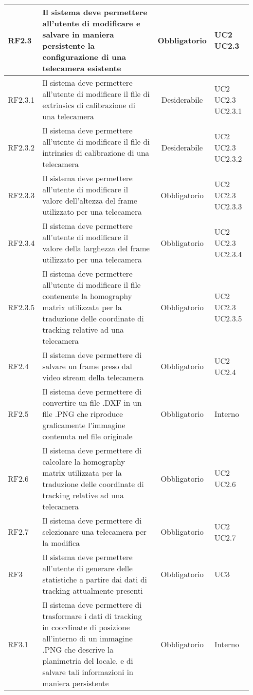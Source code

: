 \begin{center}
\begin{longtable}{ | l | p{5cm} | c | p{1.5cm} |}
RF2.3 & Il sistema deve permettere all'utente di modificare e salvare in maniera persistente la configurazione di una telecamera esistente & Obbligatorio & UC2 UC2.3 \\ \hline 
RF2.3.1 & Il sistema deve permettere all'utente di modificare il file di extrinsics di calibrazione di una telecamera & Desiderabile & UC2 UC2.3 UC2.3.1 \\ \hline 
RF2.3.2 & Il sistema deve permettere all'utente di modificare il file di intrinsics di calibrazione di una telecamera & Desiderabile & UC2 UC2.3 UC2.3.2 \\ \hline 
RF2.3.3 & Il sistema deve permettere all'utente di modificare il valore dell'altezza del frame utilizzato per una telecamera & Obbligatorio & UC2 UC2.3 UC2.3.3 \\ \hline 
RF2.3.4 & Il sistema deve permettere all'utente di modificare il valore della larghezza del frame utilizzato per una telecamera & Obbligatorio & UC2 UC2.3 UC2.3.4 \\ \hline 
RF2.3.5 & Il sistema deve permettere all'utente di modificare il file contenente la homography matrix utilizzata per la traduzione delle coordinate di tracking relative ad una telecamera & Obbligatorio & UC2 UC2.3 UC2.3.5 \\ \hline 
RF2.4 & Il sistema deve permettere di salvare un frame preso dal video stream della telecamera & Obbligatorio & UC2 UC2.4 \\ \hline 
RF2.5 & Il sistema deve permettere di convertire un file .DXF in un file .PNG che riproduce graficamente l'immagine contenuta nel file originale & Obbligatorio & Interno \\ \hline 
RF2.6 & Il sistema deve permettere di calcolare la homography matrix utilizzata per la traduzione delle coordinate di tracking relative ad una telecamera & Obbligatorio & UC2 UC2.6 \\ \hline 
RF2.7 & Il sistema deve permettere di selezionare una telecamera per la modifica & Obbligatorio & UC2 UC2.7 \\ \hline 
RF3 & Il sistema deve permettere all'utente di generare delle statistiche a partire dai dati di tracking attualmente presenti & Obbligatorio & UC3 \\ \hline 
RF3.1 & Il sistema deve permettere di trasformare i dati di tracking in coordinate di posizione all'interno di un immagine .PNG che descrive la planimetria del locale, e di salvare tali informazioni in maniera persistente & Obbligatorio & Interno \\ \hline 

\end{longtable}
\end{center}
